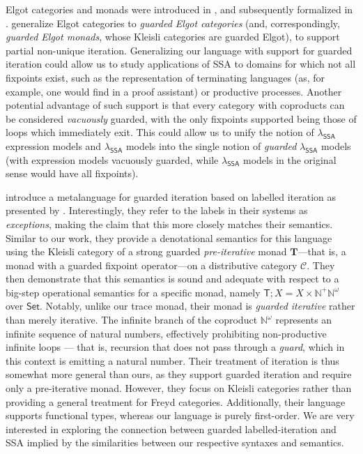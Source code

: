 \documentclass[acmsmall,screen,review]{acmart}
\newcommand{\mc}[1]{\ensuremath{\mathcal{#1}}}
\newcommand{\mb}[1]{\ensuremath{\mathbf{#1}}}
\newcommand{\ms}[1]{\ensuremath{\mathsf{#1}}}
\newcommand{\isotopessa}{\(\lambda_{\ms{SSA}}\)}
\begin{document}
Elgot categories and monads were introduced in \citet{elgot-elgot-75}, and subsequently formalized
in \citet{adamek-elgot-11}. \citet{coinductive-resumption-levy-goncharov-19} generalize Elgot
categories to \emph{guarded Elgot categories} (and, correspondingly, \emph{guarded Elgot monads},
whose Kleisli categories are guarded Elgot), to support partial non-unique iteration. Generalizing
our language with support for guarded iteration could allow us to study applications of SSA to
domains for which not all fixpoints exist, such as the representation of terminating languages (as,
for example, one would find in a proof assistant) or productive processes. Another potential
advantage of such support is that every category with coproducts can be considered \emph{vacuously}
guarded, with the only fixpoints supported being those of loops which immediately exit. This could
allow us to unify the notion of \isotopessa{} expression models and \isotopessa{} models into the
single notion of \emph{guarded} \isotopessa{} models (with expression models vacuously guarded,
while \isotopessa{} models in the original sense would have all fixpoints).

\citet{goncharov-metalang-21} introduce a metalanguage for guarded iteration based on labelled
iteration as presented by \citet{geron-iteration-16}. Interestingly, they refer to the labels in
their systems as \emph{exceptions}, making the claim that this more closely matches their semantics.
Similar to our work, they provide a denotational semantics for this language using the Kleisli
category of a strong guarded \emph{pre-iterative} monad $\mb{T}$—that is, a monad with a guarded
fixpoint operator—on a distributive category $\mc{C}$. They then demonstrate that this semantics is
sound and adequate with respect to a big-step operational semantics for a specific monad, namely
$\ms{T};X = X \times \mathbb{N}^ + \mathbb{N}^\omega$ over $\ms{Set}$. Notably, unlike our trace
monad, their monad is \emph{guarded iterative} rather than merely iterative. The infinite branch of
the coproduct $\mathbb{N}^\omega$ represents an infinite sequence of natural numbers, effectively
prohibiting non-productive infinite loops — that is, recursion that does not pass through a
\emph{guard}, which in this context is emitting a natural number. Their treatment of iteration is
thus somewhat more general than ours, as they support guarded iteration and require only a
pre-iterative monad. However, they focus on Kleisli categories rather than providing a general
treatment for Freyd categories. Additionally, their language supports functional types, whereas our
language is purely first-order. We are very interested in exploring the connection between guarded
labelled-iteration and SSA implied by the similarities between our respective syntaxes and
semantics.
\end{document}
